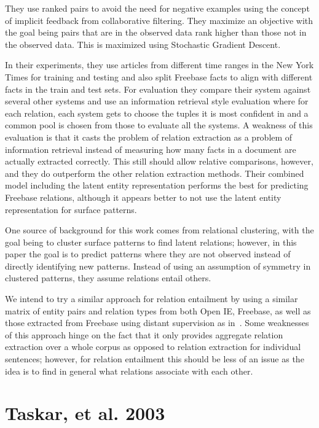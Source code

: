 \documentclass{article}
\begin{document}
They use ranked pairs to avoid the need for negative examples using the concept of implicit feedback from collaborative filtering. They maximize an objective with the goal being pairs that are in the observed data rank higher than those not in the observed data. This is maximized using Stochastic Gradient Descent.

In their experiments, they use articles from different time ranges in the New York Times for training and testing and also split Freebase facts to align with different facts in the train and test sets. For evaluation they compare their system against several other systems and use an information retrieval style evaluation where for each relation, each system gets to choose the tuples it is most confident in and a common pool is chosen from those to evaluate all the systems. A weakness of this evaluation is that it casts the problem of relation extraction as a problem of information retrieval instead of measuring how many facts in a document are actually extracted correctly. This still should allow relative comparisons, however, and they do outperform the other relation extraction methods. Their combined model including the latent entity representation performs the best for predicting Freebase relations, although it appears better to not use the latent entity representation for surface patterns.

One source of background for this work comes from relational clustering, with the goal being to cluster surface patterns to find latent relations; however, in this paper the goal is to predict patterns where they are not observed instead of directly identifying new patterns. Instead of using an assumption of symmetry in clustered patterns, they assume relations entail others.

We intend to try a similar approach for relation entailment by using a similar matrix of entity pairs and relation types from both Open IE, Freebase, as well as those extracted from Freebase using distant supervision as in~\cite{HoffmannZLZW11}. Some weaknesses of this approach hinge on the fact that it only provides aggregate relation extraction over a whole corpus as opposed to relation extraction for individual sentences; however, for relation entailment this should be less of an issue as the idea is to find in general what relations associate with each other.

\section*{Taskar, et al. 2003}
\end{document}
